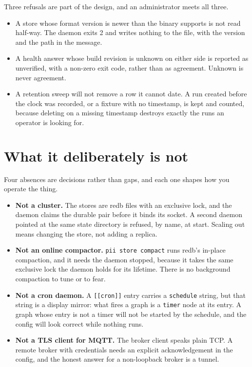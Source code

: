Three refusals are part of the design, and an administrator meets all three.

\begin{itemize}
	\item A store whose format version is newer than the binary supports is not read
	half-way. The daemon exits 2 and writes nothing to the file, with the version and the
	path in the message.
	\item A health answer whose build revision is unknown on either side is reported as
	unverified, with a non-zero exit code, rather than as agreement. Unknown is never
	agreement.
	\item A retention sweep will not remove a row it cannot date. A run created before the
	clock was recorded, or a fixture with no timestamp, is kept and counted, because
	deleting on a missing timestamp destroys exactly the runs an operator is looking for.
\end{itemize}

\section{What it deliberately is not}

Four absences are decisions rather than gaps, and each one shapes how you operate the
thing.

\begin{itemize}
	\item \textbf{Not a cluster.} The stores are redb files with an exclusive lock, and the
	daemon claims the durable pair before it binds its socket. A second daemon pointed at
	the same state directory is refused, by name, at start. Scaling out means changing the
	store, not adding a replica.
	\item \textbf{Not an online compactor.} \texttt{pii store compact} runs redb's in-place
	compaction, and it needs the daemon stopped, because it takes the same exclusive lock
	the daemon holds for its lifetime. There is no background compaction to tune or to
	fear.
	\item \textbf{Not a cron daemon.} A \texttt{[[cron]]} entry carries a
	\texttt{schedule} string, but that string is a display mirror: what fires a graph is a
	\texttt{timer} node at its entry. A graph whose entry is not a timer will not be
	started by the schedule, and the config will look correct while nothing runs.
	\item \textbf{Not a TLS client for MQTT.} The broker client speaks plain TCP. A remote
	broker with credentials needs an explicit acknowledgement in the config, and the
	honest answer for a non-loopback broker is a tunnel.
\end{itemize}

